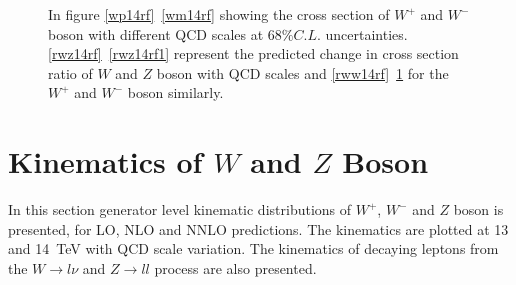\begin{figure}[H]
\begin{subfigure}{0.49\textwidth}
\vspace*{-8mm}
\caption{}
\label{rww14rf1}
\end{subfigure}
\caption{In figure \ref{wp14rf}~\ref{wm14rf} showing the cross section of $W^{+}$ and $W^{-}$ boson with different QCD scales at $68\%C.L.$ uncertainties. \ref{rwz14rf}~\ref{rwz14rf1} represent the predicted change in cross section ratio of $W$ and $Z$ boson with QCD scales and \ref{rww14rf}~\ref{rww14rf1} for the $W^{+}$ and $W^{-}$ boson similarly.} 
\label{comp3}
\end{figure}


\section{Kinematics of $W$ and $Z$ Boson}
In this section generator level kinematic distributions of $W^{+}$, $W^{-}$ and $Z$ boson is presented, for LO, NLO and NNLO predictions. The kinematics are plotted at 13 and 14~TeV with QCD scale variation. The kinematics of decaying leptons from the $W\rightarrow l\nu$ and $Z\rightarrow ll$ process are also presented.
